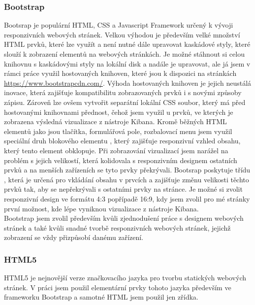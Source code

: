 \documentclass[czech,BP]{thesiskiv}
\begin{document}
\subsubsection{Bootstrap}
Bootsrap je populární HTML, CSS a Javascript Framework určený k vývoji responzivních webových stránek.\cite{Bootsrap} Velkou výhodou je především velké množství HTML prvků, které lze využít a není nutné dále upravovat kaskádové styly, které slouží k zobrazení elementů na webových stránkách. Je možné stáhnout si celou knihovnu s kaskádovými styly na lokální disk a nadále je upravovat, ale já jsem v rámci práce využil hostovaných knihoven, které jsou k dispozici na stránkách \url{https://www.bootstrapcdn.com/}. Výhoda hostovaných knihoven je jejich neustálá inovace, která zajišťuje kompatibilitu zobrazovaných prvků i s novými způsoby zápisu. Zároveň lze ovšem vytvořit separátní lokální CSS soubor, který má před hostovanými knihovnami přednost, čehož jsem využil u prvků, ve kterých je zobrazena výsledná vizualizace z nástroje Kibana. Kromě běžných HTML elementů jako jsou tlačítka, formulářová pole, rozbalovací menu jsem využil speciální druh blokového elementu , který zajišťuje responzivní vzhled obsahu, který tento element obklopuje. Při zobrazování vizualizací jsem narážel na problém s jejich velikostí, která kolidovala s responzivním designem ostatních prvků a na menších zařízeních se tyto prvky překrývali. Bootsrap poskytuje třídu , která je určená pro vkládání obsahu v prvcích  a zajišťuje změnu velikosti těchto prvků tak, aby se nepřekrývali s ostatními prvky na stránce. Je možné si zvolit responzivní design ve formátu 4:3 popřípadě 16:9, kdy jsem zvolil pro mé stránky první možnost, kde lépe vyniknou vizualizace z nástroje Kibana.
\\
Bootstrap jsem zvolil především kvůli zjednodušení práce s designem webových stránek a také kvůli snadné tvorbě responzivních webových stránek, jejichž zobrazení se vždy přizpůsobí danému zařízení.
\subsubsection{HTML5}
HTML5 je nejnovější verze značkovacího jazyka pro tvorbu statických webových stránek. V práci jsem použil elementární prvky tohoto jazyka především ve frameworku Bootstrap a samotné HTML jsem použil jen zřídka.
\end{document}
